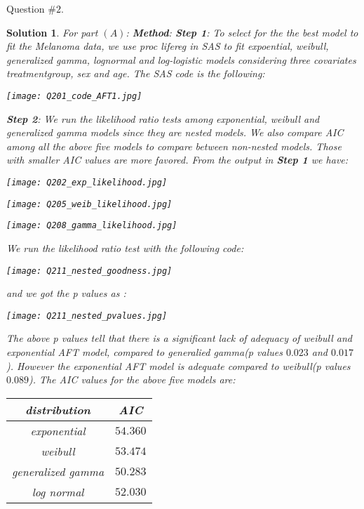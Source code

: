 \documentclass[11pt]{article}
\newtheorem{sol}{Solution}
\begin{document}
Question $\#2$.
\begin{sol}
	For part $(A)$:\vskip 2mm
	{\bf Method}:\vskip 2mm
	{\bf Step 1}: To select for the  the best model to fit the Melanoma data, we use proc lifereg in SAS to fit expoential, weibull, generalized gamma, lognormal and log-logistic models considering three covariates treatmentgroup, sex and age.\vskip 2mm
	The SAS code is the following:
	\begin{center}
		\texttt{[image: Q201\_code\_AFT1.jpg]}
	\end{center}
	{\bf Step 2}: We run the likelihood ratio tests among exponential, weibull and generalized gamma models since they are nested models. We also compare AIC among all the above five models to compare between non-nested models. Those with smaller AIC values are more favored. \vskip 2mm
	From the output in {\bf Step 1} we have:\vskip 2mm
	\begin{center}
		\texttt{[image: Q202\_exp\_likelihood.jpg]}
	\end{center}
	\begin{center}
		\texttt{[image: Q205\_weib\_likelihood.jpg]}
	\end{center}
	\begin{center}
		\texttt{[image: Q208\_gamma\_likelihood.jpg]}
	\end{center}
	We run the likelihood ratio test with the following code:
	\begin{center}
		\texttt{[image: Q211\_nested\_goodness.jpg]}
	\end{center}
	and we got the p values as :
	\begin{center}
		\texttt{[image: Q211\_nested\_pvalues.jpg]}
	\end{center}
	The above p values tell that there is a significant lack of adequacy of weibull and exponential AFT model, compared to generalied gamma(p values $0.023$ and $0.017$). However the exponential AFT model is adequate compared to weibull(p values $0.089$).\vskip 2mm
	The AIC values for the above five models are:\vskip 2mm
	\begin{center}
	\begin{tabular}{|c|c|}
		\hline
		distribution & AIC\\
		\hline
		exponential & $54.360$\\
		\hline
		weibull & $53.474$\\
		\hline
		generalized gamma & $50.283$\\
		\hline
		log normal & $52.030$\\

\end{tabular}
\end{center}
\end{sol}
\end{document}
